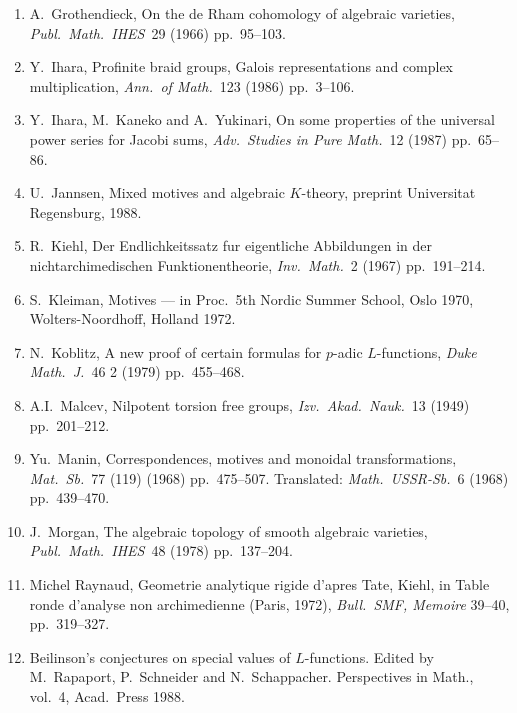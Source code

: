 \documentclass[12pt,a4paper]{article}
\theoremstyle{plain}
\theoremstyle{definition}
\theoremstyle{remark}
\begin{document}
\begin{enumerate}
\item[{[G]}] A.\ Grothendieck, On the de Rham cohomology of algebraic
varieties, \textit{Publ.\ Math.\ IHES}\ 29 (1966) pp.\ 95--103.

\item[{[I]}] Y.\ Ihara, Profinite braid groups, Galois representations
and complex multiplication, \textit{Ann.\ of Math.}\ 123 (1986) pp.\ 3--106.

\item[{[IKY]}] Y.\ Ihara, M.\ Kaneko and A.\ Yukinari, On some
properties of the universal power series for Jacobi sums,
\textit{Adv.\ Studies in Pure Math.}\ 12 (1987) pp.\ 65--86.

\item[{[J]}] U.\ Jannsen, Mixed motives and algebraic $K$-theory,
preprint Universitat Regensburg, 1988.

\item[{[Ki]}] R.\ Kiehl, Der Endlichkeitssatz fur eigentliche
Abbildungen in der nichtarchimedischen Funktionentheorie,
\textit{Inv.\ Math.}\ 2 (1967) pp.\ 191--214.

\item[{[Kl]}] S.\ Kleiman, Motives --- in Proc.\ 5th Nordic Summer
School, Oslo 1970, Wolters-Noordhoff, Holland 1972.

\item[{[Ko]}] N.\ Koblitz, A new proof of certain formulas for $p$-adic
$L$-functions, \textit{Duke Math.\ J.}\ 46 2 (1979) pp.\ 455--468.

\item[{[Ma1]}] A.I.\ Malcev, Nilpotent torsion free groups,
\textit{Izv.\ Akad.\ Nauk.}\ 13 (1949) pp.\ 201--212.

\item[{[Man]}] Yu.\ Manin, Correspondences, motives and monoidal
transformations, \textit{Mat.\ Sb.}\ 77 (119) (1968) pp.\ 475--507.
Translated: \textit{Math.\ USSR-Sb.}\ 6 (1968) pp.\ 439--470.

\item[{[Mo]}] J.\ Morgan, The algebraic topology of smooth algebraic
varieties, \textit{Publ.\ Math.\ IHES}\ 48 (1978) pp.\ 137--204.

\item[{[R]}] Michel Raynaud, Geometrie analytique rigide d'apres Tate,
Kiehl, in Table ronde d'analyse non archimedienne (Paris, 1972),
\textit{Bull.\ SMF, Memoire} 39--40, pp.\ 319--327.

\item[{[RSS]}] Beilinson's conjectures on special values of
$L$-functions. Edited by M.\ Rapaport, P.\ Schneider and N.\ Schappacher.
Perspectives in Math., vol.\ 4, Acad.\ Press 1988.


\end{enumerate}
\end{document}
